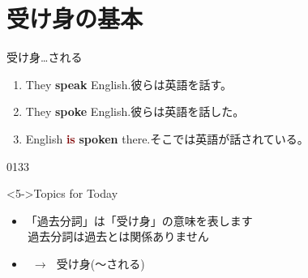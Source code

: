 \documentclass[aspectratio=169,xcolor={dvipsnames,table}]{beamer}
\newcommand{\myaudio}[1]{\href{#1}{\faVolumeUp}}
\begin{document}
\section{受け身の基本}
\begin{frame}[plain]{受け身\hspace{20pt}\ldots される}
  \large
  \begin{enumerate}
    \item<1-> They \textbf{speak} English.\hfill{}{\scriptsize 彼らは英語を話す。}
    \item<2-> They \textbf{spoke} English.\hfill{\scriptsize 彼らは英語を話した。}
    \item<3-> English \textcolor{Maroon}{\bfseries is} \textcolor{NavyBlue}{\bfseries spoken} there.\hfill{\scriptsize そこでは英語が話されている。}
  \end{enumerate}

  \begin{center}

  \end{center}


  \hfill{\tiny 0133}\,{\scriptsize \myaudio{./audio/051_passive_01.mp3}}
  \begin{block}<5->{Topics for Today}
    \begin{itemize}[square]\small
      \item 「過去分詞」は「受け身」の意味を表します\\
            \hfill{\textdbend\,過去分詞は過去とは関係ありません}
      \item {}\, $\longrightarrow$\,\,\,\,受け身(〜される)
    \end{itemize}
  \end{block}
\end{frame}
\end{document}
